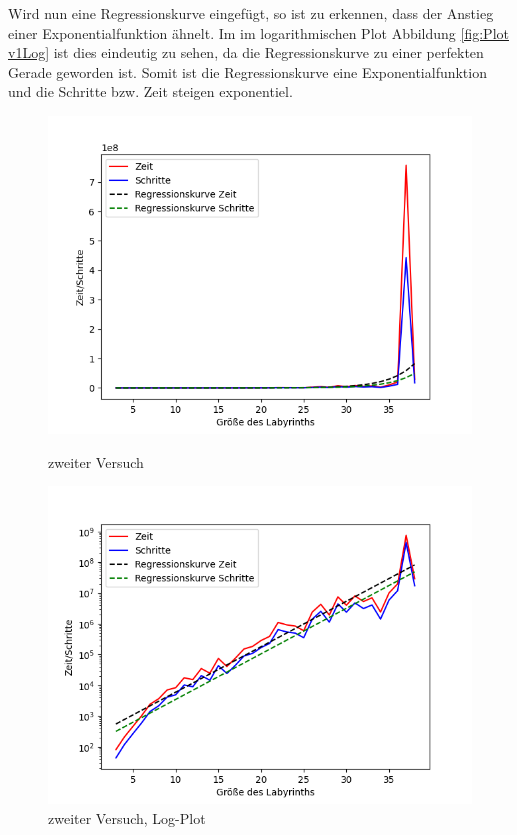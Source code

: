 \documentclass[12pt, a4paper, titlepage]{article}
\begin{document}
Wird nun eine Regressionskurve eingefügt, so ist zu erkennen, dass der Anstieg einer Exponentialfunktion ähnelt.
Im im logarithmischen Plot Abbildung \ref{fig:Plot v1Log} ist dies eindeutig zu sehen, da die Regressionskurve zu einer perfekten Gerade geworden ist.
Somit ist die Regressionskurve eine Exponentialfunktion und die Schritte bzw. Zeit steigen exponentiel.

\begin{figure}[h]
\begin{minipage}{.5\textwidth}
	\includegraphics[scale=.45]{v2Aus.png}
	\caption{zweiter Versuch}
	\label{fig:Plot v2}
\end{minipage}
\begin{minipage}{.5\textwidth}
	\includegraphics[scale=.45]{v2AusLog.png}
	\caption{zweiter Versuch, Log-Plot}
	\label{fig:Plot v2Log}
\end{minipage}
\end{figure}
\end{document}
